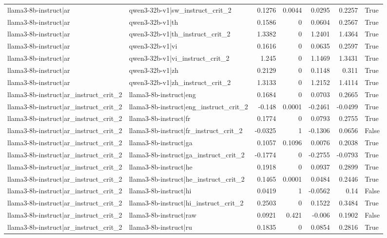 \begin{table}
\begin{tabular}{l l r r r r l}
llama3-8b-instruct|ar & qwen3-32b-v1|sw_instruct_crit_2 & 0.1276 & 0.0044 & 0.0295 & 0.2257 & True \\
llama3-8b-instruct|ar & qwen3-32b-v1|th & 0.1586 & 0 & 0.0604 & 0.2567 & True \\
llama3-8b-instruct|ar & qwen3-32b-v1|th_instruct_crit_2 & 1.3382 & 0 & 1.2401 & 1.4364 & True \\
llama3-8b-instruct|ar & qwen3-32b-v1|vi & 0.1616 & 0 & 0.0635 & 0.2597 & True \\
llama3-8b-instruct|ar & qwen3-32b-v1|vi_instruct_crit_2 & 1.245 & 0 & 1.1469 & 1.3431 & True \\
llama3-8b-instruct|ar & qwen3-32b-v1|zh & 0.2129 & 0 & 0.1148 & 0.311 & True \\
llama3-8b-instruct|ar & qwen3-32b-v1|zh_instruct_crit_2 & 1.3133 & 0 & 1.2152 & 1.4114 & True \\
llama3-8b-instruct|ar_instruct_crit_2 & llama3-8b-instruct|eng & 0.1684 & 0 & 0.0703 & 0.2665 & True \\
llama3-8b-instruct|ar_instruct_crit_2 & llama3-8b-instruct|eng_instruct_crit_2 & -0.148 & 0.0001 & -0.2461 & -0.0499 & True \\
llama3-8b-instruct|ar_instruct_crit_2 & llama3-8b-instruct|fr & 0.1774 & 0 & 0.0793 & 0.2755 & True \\
llama3-8b-instruct|ar_instruct_crit_2 & llama3-8b-instruct|fr_instruct_crit_2 & -0.0325 & 1 & -0.1306 & 0.0656 & False \\
llama3-8b-instruct|ar_instruct_crit_2 & llama3-8b-instruct|ga & 0.1057 & 0.1096 & 0.0076 & 0.2038 & True \\
llama3-8b-instruct|ar_instruct_crit_2 & llama3-8b-instruct|ga_instruct_crit_2 & -0.1774 & 0 & -0.2755 & -0.0793 & True \\
llama3-8b-instruct|ar_instruct_crit_2 & llama3-8b-instruct|he & 0.1918 & 0 & 0.0937 & 0.2899 & True \\
llama3-8b-instruct|ar_instruct_crit_2 & llama3-8b-instruct|he_instruct_crit_2 & 0.1465 & 0.0001 & 0.0484 & 0.2446 & True \\
llama3-8b-instruct|ar_instruct_crit_2 & llama3-8b-instruct|hi & 0.0419 & 1 & -0.0562 & 0.14 & False \\
llama3-8b-instruct|ar_instruct_crit_2 & llama3-8b-instruct|hi_instruct_crit_2 & 0.2503 & 0 & 0.1522 & 0.3484 & True \\
llama3-8b-instruct|ar_instruct_crit_2 & llama3-8b-instruct|raw & 0.0921 & 0.421 & -0.006 & 0.1902 & False \\
llama3-8b-instruct|ar_instruct_crit_2 & llama3-8b-instruct|ru & 0.1835 & 0 & 0.0854 & 0.2816 & True \\

\end{tabular}
\end{table}
